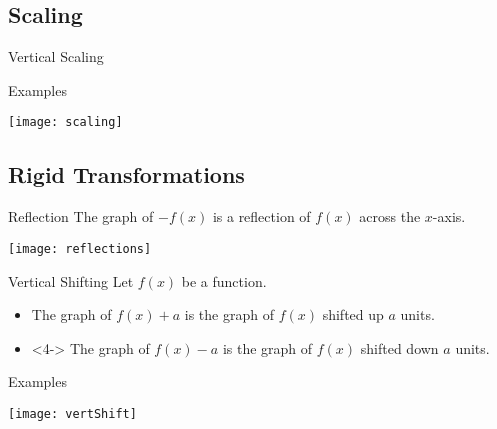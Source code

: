 \documentclass[Lecture.tex]{subfiles}
\begin{document}
\subsection{Scaling}

\begin{frame}{Vertical Scaling}
\end{frame}

\begin{frame}{Examples}
  \begin{center}
    \texttt{[image: scaling]}
  \end{center}
\end{frame}
\subsection{Rigid Transformations}
\begin{frame}{Reflection}
  The graph of $-f(x)$ is a reflection of $f(x)$ across the $x$-axis.
  \begin{center}
    \texttt{[image: reflections]}
  \end{center}
\end{frame}

\begin{frame}{Vertical Shifting}
  Let $f(x)$ be a function.
  \begin{itemize}
    \item<3->
      The graph of $f(x) + a$ is the graph of $f(x)$ shifted up $a$ units.
    \item
      <4->
      The graph of $f(x) - a$ is the graph of $f(x)$ shifted down $a$ units.
  \end{itemize}
\end{frame}

\begin{frame}{Examples}
  \begin{center}
    \texttt{[image: vertShift]}
  \end{center}
\end{frame}
\end{document}
